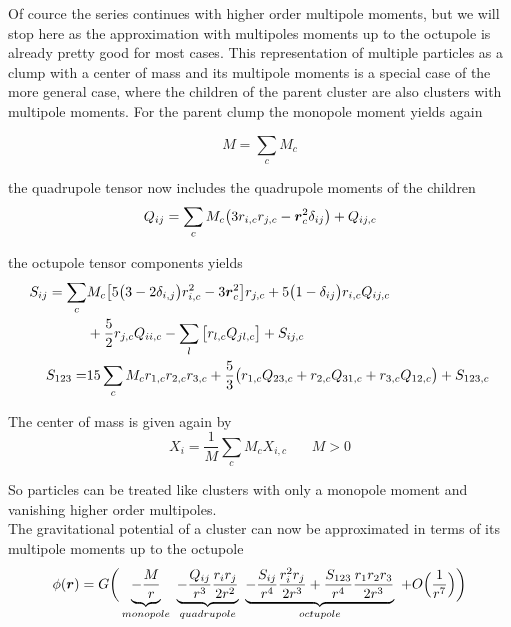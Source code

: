 Of cource the series continues with higher order multipole moments, but we will stop here as the approximation with multipoles moments up to the octupole is already pretty good for most cases. This representation of multiple particles as a clump with a center of mass and its multipole moments is a special case of the more general case, where the children of the parent cluster are also clusters with multipole moments. For the parent clump the monopole moment yields again

\begin{equation}
\label{eq_monopole}
M = \sum_{c} M_{c}
\end{equation}

the quadrupole tensor now includes the quadrupole moments of the children 
\begin{equation}
\label{eq_quadrupole}
Q_{ij} = \sum_{c} M_{c} \big( 3 r_{i, c} r_{j, c} - \boldsymbol{r}_{c}^{2} \delta_{i j} \big) + Q_{i j, c} 
\end{equation}

the octupole tensor components yields
\begin{align}
\label{eq_octupole}
S_{ij} = \sum_{c}&  M_{c} \big[ 5 \big( 3 - 2 \delta_{i,j} \big) r_{i, c}^{2} - 3 \boldsymbol{r}_{c}^2 \big] r_{j, c} 
+ 5 \big( 1 - \delta_{i j} \big) r_{i, c} Q_{i j, c} \nonumber \\
&+ \frac{5}{2} r_{j, c} Q_{i i, c} - \sum_{l} \big[ r_{l, c} Q_{j l, c} \big] + S_{i j, c} \\
S_{1 2 3} =& 15 \sum_{c} M_{c} r_{1, c} r_{2, c} r_{3, c} + \frac{5}{3} \big( r_{1, c} Q_{2 3, c} + r_{2, c} Q_{3 1, c} + r_{3, c} Q_{1 2, c} \big) + S_{1 2 3, c }
\end{align}

The center of mass is given again by
\begin{equation}
X_{i} = \frac{1}{M} \sum_{c} M_{c} X_{i, c} ~~~~~~~~  M > 0
\end{equation}

So particles can be treated like clusters with only a monopole moment and vanishing higher order multipoles.\\

The gravitational potential of a cluster can now be approximated in terms of its multipole moments up to the octupole
\begin{equation}
\phi(\boldsymbol{r}) = G \bigg(
\underbrace{ - \frac{M}{r} }_{monopole} ~ 
\underbrace{ - \frac{Q_{i j}}{r^{3}} \frac{r_{i} r_{j} }{2 r^{2} } }_{quadrupole}~ 
\underbrace{ - \frac{S_{i j}}{r^{4}} \frac{r_{i}^2 r_{j}}{2 r^{3} } + \frac{ S_{1 2 3} }{r^{4}}\frac{ r_{1} r_{2} r_{3} }{2 r^{3}} }_{octupole}~ 
+ O\Big(\frac{1}{r^{7}}\Big) \bigg)
\end{equation}

